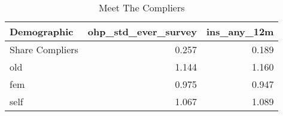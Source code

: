 \begin{table}[!h]
\centering
\caption{Meet The Compliers}
\centering
\begin{tabular}[t]{lrr}
\toprule
Demographic & ohp\_std\_ever\_survey & ins\_any\_12m\\
\midrule
Share Compliers & 0.257 & 0.189\\
old & 1.144 & 1.160\\
fem & 0.975 & 0.947\\
self & 1.067 & 1.089\\
\bottomrule
\end{tabular}
\end{table}
